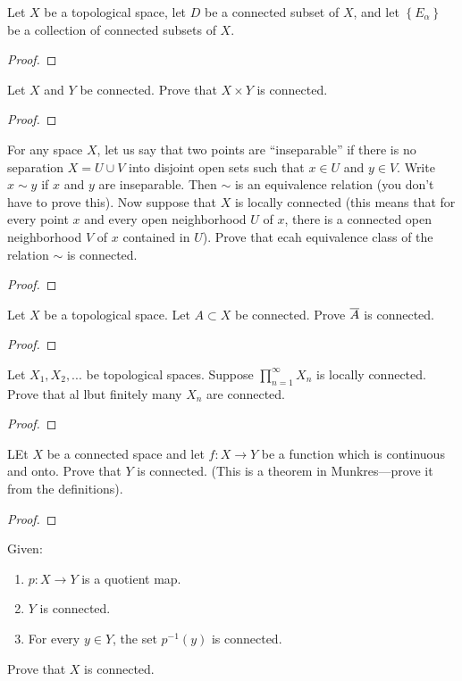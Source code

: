 \begin{problem}
Let $X$ be a topological space, let $D$ be a connected subset of
$X$, and let $\left\{E_\alpha\right\}$ be a collection of
connected subsets of $X$.
\end{problem}
\begin{proof}
\end{proof}
\begin{problem}
Let $X$ and $Y$ be connected. Prove that $X\times Y$ is connected.
\end{problem}
\begin{proof}
\end{proof}
\begin{problem}
For any space $X$, let us say that two points are ``inseparable''
if there is no separation $X=U\cup V$ into disjoint open sets
such that $x\in U$ and $y\in V$. Write $x\sim y$ if $x$ and $y$
are inseparable. Then $\sim$ is an equivalence relation (you
don't have to prove this). Now suppose that $X$ is locally
connected (this means that for every point $x$ and every open
neighborhood $U$ of $x$, there is a connected open neighborhood
$V$ of $x$ contained in $U$). Prove that ecah equivalence class
of the relation $\sim$ is connected.
\end{problem}
\begin{proof}
\end{proof}
\begin{problem}
Let $X$ be a topological space. Let $A\subset X$ be
connected. Prove $\overline{A}$ is connected.
\end{problem}
\begin{proof}
\end{proof}
\begin{problem}
Let $X_1,X_2,...$ be topological spaces. Suppose
$\prod_{n=1}^\infty X_n$ is locally connected. Prove that al lbut
finitely many $X_n$ are connected.
\end{problem}
\begin{proof}
\end{proof}
\begin{problem}
LEt $X$ be a connected space and let $f\colon X\to Y$ be a
function which is continuous and onto. Prove that $Y$ is
connected. (This is a theorem in Munkres---prove it from the
definitions).
\end{problem}
\begin{proof}
\end{proof}
\begin{problem}
Given:
\begin{enumerate}[noitemsep,label=(\roman*)]
\item $p\colon X\to Y$ is a quotient map.
\item $Y$ is connected.
\item For every $y\in Y$, the set $p^{-1}(y)$ is connected.
\end{enumerate}
Prove that $X$ is connected.
\end{problem}
